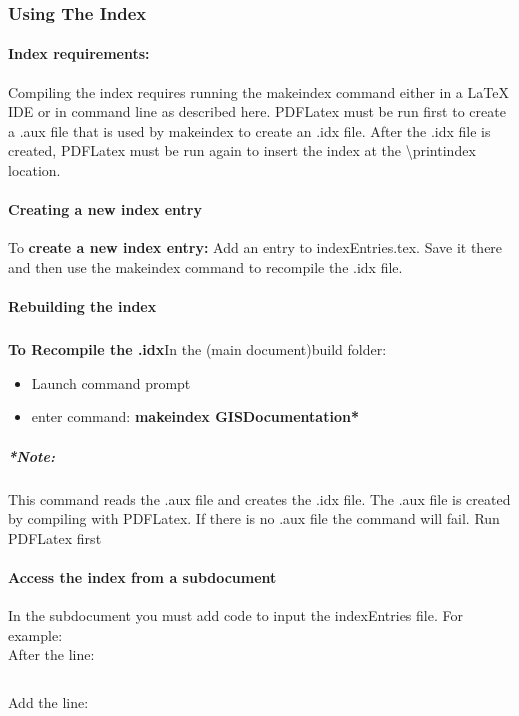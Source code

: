\documentclass[class=book , crop=false]{standalone}
\begin{document}
\subsubsection[Using The Index]{{\Large Using The Index}}
\paragraph{Index requirements:}
Compiling the index requires running the makeindex command either in a \LaTeX{} IDE or in command line as described here.  PDFLatex must be run first to create a .aux file that is used by makeindex to create an .idx file.  After the .idx file is created, PDFLatex must be run again to insert the index at the \textbackslash printindex location.

\paragraph{Creating a new index entry}
To \textbf{create a new index entry:} Add an entry to indexEntries.tex.  Save it there and then use the makeindex command to recompile the .idx file.

\paragraph{Rebuilding the index}
\subparagraph*{}\textbf{To Recompile the .idx}In the (main document)build folder:
\begin{itemize}
\item Launch command prompt
\item enter command: \textbf{{\large makeindex GISDocumentation*}}
\end{itemize}
\subparagraph{*Note:} {\footnotesize This command reads the .aux file and creates the .idx file.  The .aux file is created by compiling with PDFLatex.  If there is no .aux file the command will fail. Run PDFLatex first}

\paragraph{Access the index from a subdocument}
In the subdocument you must add code to input the indexEntries file.  For example:\\
After the line:
\begin{verbatim}

\end{verbatim}
Add the line:
\begin{verbatim}

\end{verbatim}
\end{document}
